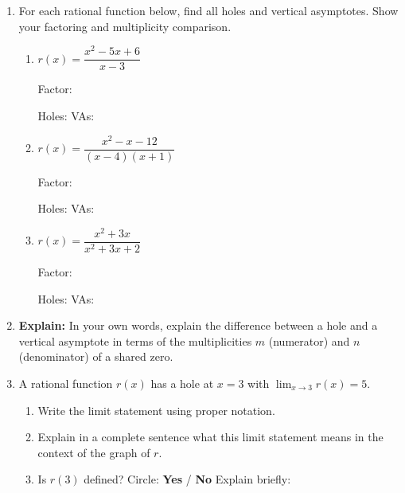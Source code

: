 \documentclass[10pt]{article}
\begin{document}
\namedateperiod

\vspace{0.12in}

\begin{enumerate}[itemsep=18pt]

\item For each rational function below, find all holes and vertical asymptotes.
      Show your factoring and multiplicity comparison.

      \begin{enumerate}[label=(\alph*), itemsep=12pt]

        \item $\displaystyle r(x) = \dfrac{x^2 - 5x + 6}{x - 3}$

              \vspace{0.06in}
              Factor: \blank{6cm}

              Holes: \blank{4cm} \qquad VAs: \blank{4cm}

        \item $\displaystyle r(x) = \dfrac{x^2 - x - 12}{(x-4)(x+1)}$

              \vspace{0.06in}
              Factor: \blank{6cm}

              Holes: \blank{4cm} \qquad VAs: \blank{4cm}

        \item $\displaystyle r(x) = \dfrac{x^2 + 3x}{x^2 + 3x + 2}$

              \vspace{0.06in}
              Factor: \blank{6cm}

              Holes: \blank{4cm} \qquad VAs: \blank{4cm}

      \end{enumerate}

\item \textbf{Explain:} In your own words, explain the difference between a hole and a
      vertical asymptote in terms of the multiplicities $m$ (numerator) and $n$ (denominator)
      of a shared zero.

      \vspace{0.08in}

\item A rational function $r(x)$ has a hole at $x = 3$ with $\displaystyle\lim_{x \to 3} r(x) = 5$.

      \begin{enumerate}[label=(\alph*), itemsep=8pt]
        \item Write the limit statement using proper notation. \blank{5cm}
        \item Explain in a complete sentence what this limit statement means in the context
              of the graph of $r$.
              \writeline
        \item Is $r(3)$ defined? Circle: \quad \textbf{Yes} \quad / \quad \textbf{No} \quad
              Explain briefly: \blank{5cm}
      \end{enumerate}


\end{enumerate}
\end{document}
